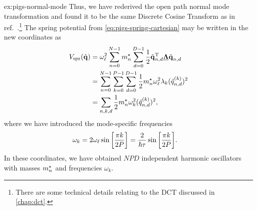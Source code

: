 \begin{DefAnswer}{ex:pigs-normal-mode}
	Thus, we have rederived the open path normal mode transformation and found it to be the same Discrete Cosine Transform as in ref.~\cite{constable2012path}.\footnote{
		There are some technical details relating to the DCT discussed in \vref{chap:dct}.
	}
	The spring potential from \cref{eq:pigs-spring-cartesian} may be written in the new coordinates as
	\begin{subequations}
	\begin{align}
		V_\mathrm{spr}(\tilde{\bm{\mathbf{q}}})
		&= \omega_\ell^2 \sum_{n=0}^{N-1} {m}^\star_n \sum_{d=0}^{D-1} \frac{1}{2} \tilde{\bm{\mathbf{q}}}_{n,d}^\mathrm{T} \underline{\bm{\mathbf{\Lambda}}} \tilde{\bm{\mathbf{q}}}_{n,d} \\
		&= \sum_{n=0}^{N-1} \sum_{k=0}^{P-1} \sum_{d=0}^{D-1} \frac{1}{2} {m}^\star_n \omega_\ell^2 \lambda_k (\tilde{q}_{n,d}^{(k)})^2 \\
		&= \sum_{n,k,d} \frac{1}{2} {m}^\star_n \omega_k^2 (\tilde{q}_{n,d}^{(k)})^2,
	\end{align}
	\end{subequations}
	where we have introduced the mode-specific frequencies
	\begin{align}
		\omega_k
		&= 2 \omega_\ell \sin{\left[ \frac{\pi k}{2 P} \right]}
		= \frac{2}{\hbar \tau} \sin{\left[ \frac{\pi k}{2 P} \right]}.
	\end{align}
	In these coordinates, we have obtained $N P D$ independent harmonic oscillators with masses ${m}^\star_n$ and frequencies $\omega_k$.


\end{DefAnswer}
